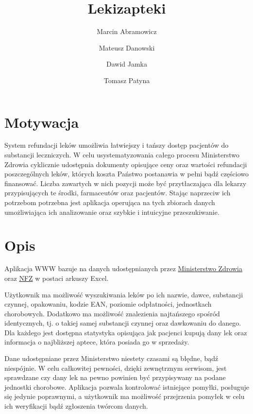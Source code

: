 \documentclass{article}
\title{Lekizapteki}
\author{Marcin Abramowicz \and Mateusz Danowski \and Dawid Jamka \and Tomasz Patyna}
\begin{document}
\maketitle


\section{Motywacja}

System refundacji leków umożliwia łatwiejszy i tańszy dostęp pacjentów do substancji leczniczych. W celu usystematyzowania całego procesu Ministerstwo Zdrowia cyklicznie udostępnia dokumenty opisujące ceny oraz wartości refundacji poszczególnych leków, których koszta Państwo postanawia w pełni bądź częściowo finansować. Liczba zawartych w nich pozycji może być przytłaczająca dla lekarzy przypisujących te środki, farmaceutów oraz pacjentów. Stając naprzeciw ich potrzebom potrzebna jest aplikacja operująca na tych zbiorach danych umożliwiająca ich analizowanie oraz szybkie i intuicyjne przeszukiwanie.


\section{Opis}

Aplikacja WWW bazuje na danych udostępnianych przez
\href{https://www.gov.pl/web/zdrowie/obwieszczenia-ministra-zdrowia-lista-lekow-refundowanych?fbclid=IwAR1U3YB3yON5EN2s1qdYRbcIeh7iDxqeOtQoEYGFvX9ozGDWdURIK2JOMRs}
{Ministerstwo Zdrowia}
oraz \href{https://www.nfz.gov.pl/aktualnosci/aktualnosci-centrali/komunikat-dgl,7465.html?fbclid=IwAR0F41XjLwTg7XQdUjeYpE_KS4VVZk50etlbYDpwxhxOR2ZLdslMatUtbEU}{NFZ}
w postaci arkuszy Excel.

Użytkownik ma możliwość wyszukiwania leków po ich nazwie, dawce, substancji czynnej, opakowaniu, kodzie EAN, poziomie odpłatności, jednostkach chorobowych. Dodatkowo ma możliwość znalezienia najtańszego spośród identycznych, tj. o takiej samej substancji czynnej oraz dawkowaniu do danego. Dla każdego jest dostępna statystyka opisująca jak pacjenci kupują dany lek oraz informacja o najbliższej aptece, która posiada go w sprzedaży. 

Dane udostępniane przez Ministerstwo niestety czasami są błędne, bądź niespójnie. W celu całkowitej pewności, dzięki zewnętrznym serwisom, jest sprawdzane czy dany lek na pewno powinien być przypisywany na podane jednostki chorobowe. Aplikacja pozwala kontrolować istniejące pomyłki, posługuje się jedynie poprawnymi, a użytkownik ma możliwość przejrzenia pomyłek w celu ich weryfikacji bądź zgłoszenia twórcom danych.
\end{document}
